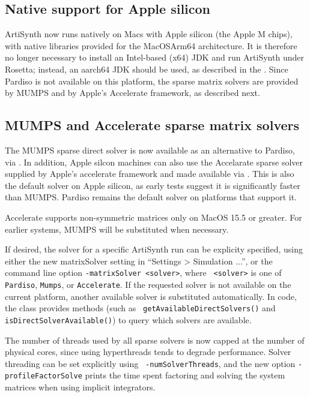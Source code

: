 \documentclass{article}
\begin{document}
\subsection{Native support for Apple silicon}

ArtiSynth now runs natively on Macs with Apple silicon (the Apple M
chips), with native libraries provided for the MacOSArm64
architecture. It is therefore no longer necessary to install an
Intel-based ({\sf x64}) JDK and run ArtiSynth under Rosetta; instead,
an {\sf aarch64} JDK should be used, as described in the
.  Since Pardiso is not available on this platform,
the sparse matrix solvers are provided by MUMPS and by Apple's
Accelerate framework, as described next.

\subsection{MUMPS and Accelerate sparse matrix solvers}

The MUMPS sparse direct solver is now available as an alternative to
Pardiso, via . In addition,
Apple silcon machines can also use the Accelarate sparse solver
supplied by Apple's accelerate framework and made available via
. This is also the
default solver on Apple silicon, as early tests suggest it is
significantly faster than MUMPS. Pardiso remains the default solver on
platforms that support it.

\begin{sideblock}
Accelerate supports non-symmetric matrices only on MacOS 15.5 or
greater. For earlier systems, MUMPS will be substituted when necessary.
\end{sideblock}

If desired, the solver for a specific ArtiSynth run can be explicity specified,
using either the new {\sf matrixSolver} setting in ``{\sf Settings > Simulation
...}'', or the command line option {\tt -matrixSolver <solver>}, where {\tt
<solver>} is one of {\tt Pardiso}, {\tt Mumps}, or {\tt Accelerate}.  If the
requested solver is not available on the current platform, another available
solver is substituted automatically. In code, the class
 provides methods (such as {\tt
getAvailableDirectSolvers()} and {\tt isDirectSolverAvailable()}) to query
which solvers are available.

The number of threads used by all sparse solvers is now capped at the
number of physical cores, since using hyperthreads tends to degrade
performance. Solver threading can be set explicitly using {\tt
-numSolverThreads}, and the new option {\tt -profileFactorSolve}
prints the time spent factoring and solving the system matrices when
using implicit integrators.
\end{document}
